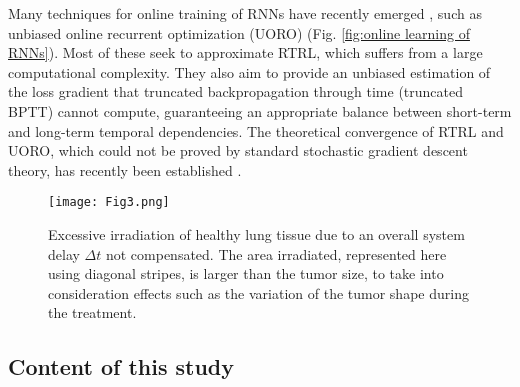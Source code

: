 \documentclass[twocolumn,a4paper]{svjour3} \sloppy          \smartqed
\begin{document}
Many techniques for online training of RNNs have recently emerged \cite{ollivier2015training, tallec2017unbiasing, jaderberg2017decoupled, mujika2018approximating, roth2018kernel, benzing2019optimal, murray2019local, aicher2020adaptively, menick2020practical, marschall2020unified, bohnstingl2020online}, such as unbiased online recurrent optimization (UORO) \cite{tallec2017unbiased} (Fig. \ref{fig:online learning of RNNs}). Most of these seek to approximate RTRL, which suffers from a large computational complexity. They also aim to provide an unbiased estimation of the loss gradient that truncated backpropagation through time (truncated BPTT) \cite{jaeger2002tutorial} cannot compute, guaranteeing an appropriate balance between short-term and long-term temporal dependencies. The theoretical convergence of RTRL and UORO, which could not be proved by standard stochastic gradient descent theory, has recently been established \cite{masse2020convergence}.



\begin{figure}[htb!]
\centering
\texttt{[image: Fig3.png]}
\caption{Excessive irradiation of healthy lung tissue due to an overall system delay $ \Delta t$ not compensated. The area irradiated, represented here using diagonal stripes, is larger than the tumor size, to take into consideration effects such as the variation of the tumor shape during the treatment\protect\footnotemark .} \label{fig:irradiation delay}
\end{figure}



\subsection{Content of this study}
\end{document}
